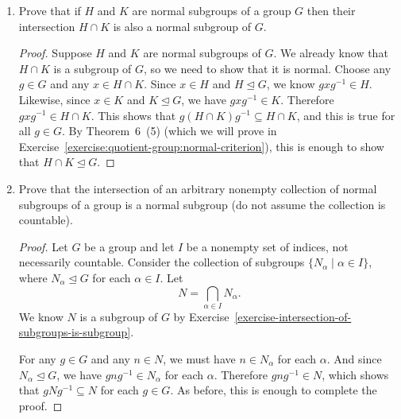  \label{exercise:quotient-group:intersection-of-normal}
\begin{enumerate}
\item Prove that if $H$ and $K$ are normal subgroups of a group $G$
  then their intersection $H\cap K$ is also a normal subgroup of $G$.
  \begin{proof}
    Suppose $H$ and $K$ are normal subgroups of $G$. We already know
    that $H\cap K$ is a subgroup of $G$, so we need to show that it is
    normal. Choose any $g\in G$ and any $x\in H\cap K$. Since $x\in H$
    and $H\trianglelefteq G$, we know $gxg^{-1}\in H$. Likewise, since
    $x\in K$ and $K\trianglelefteq G$, we have $gxg^{-1}\in
    K$. Therefore $gxg^{-1}\in H\cap K$. This shows that
    $g(H\cap K)g^{-1}\subseteq H\cap K$, and this is true for all
    $g\in G$. By Theorem~6~(5) (which we will prove in
    Exercise~\ref{exercise:quotient-group:normal-criterion}), this is
    enough to show that $H\cap K\trianglelefteq G$.
  \end{proof}
\item Prove that the intersection of an arbitrary nonempty collection
  of normal subgroups of a group is a normal subgroup (do not assume
  the collection is countable).
  \begin{proof}
    Let $G$ be a group and let $I$ be a nonempty set of indices, not
    necessarily countable. Consider the collection of subgroups
    $\{N_\alpha \mid \alpha\in I\}$, where $N_\alpha\trianglelefteq G$
    for each $\alpha\in I$. Let
    \begin{equation*}
      N = \bigcap_{\alpha\in I}N_\alpha.
    \end{equation*}
    We know $N$ is a subgroup of $G$ by
    Exercise~\ref{exercise-intersection-of-subgroups-is-subgroup}.

    For any $g\in G$ and any $n\in N$, we must have $n\in N_\alpha$
    for each $\alpha$. And since $N_\alpha\trianglelefteq G$, we have
    $gng^{-1}\in N_\alpha$ for each $\alpha$. Therefore
    $gng^{-1}\in N$, which shows that $gNg^{-1}\subseteq N$ for each
    $g\in G$. As before, this is enough to complete the proof.
  \end{proof}
\end{enumerate}

